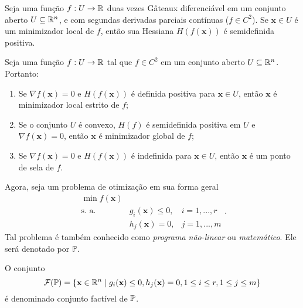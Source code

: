 \begin{theorem}
Seja uma fun\c{c}\~{a}o $f: U \to \mathbb{R}$ duas vezes G\^{a}teaux diferenci\'{a}vel em um conjunto aberto $U \subseteq \mathbb{R}^{n}$, e com segundas derivadas parciais cont\'{i}nuas ($f \in C^2$). Se $\mathbf{x} \in U$ \'{e} um minimizador local de $f$, ent\~{a}o sua Hessiana $H(f(\mathbf{x}))$ \'{e} semidefinida positiva.
\end{theorem}

\begin{theorem}
Seja uma fun\c{c}\~{a}o $f: U \to \mathbb{R}$ tal que $f \in C^2$ em um conjunto aberto $U \subseteq \mathbb{R}^{n}$. Portanto:
\begin{enumerate}[label=(\alph*)]
\item Se $\nabla f(\mathbf{x}) = 0$ e $H(f(\mathbf{x}))$ \'{e} definida positiva para $\mathbf{x} \in U$, ent\~{a}o $\mathbf{x}$ \'{e} minimizador local estrito de $f$;
\item Se o conjunto $U$ \'{e} convexo, $H(f)$ \'{e} semidefinida positiva em $U$ e $\nabla f(\mathbf{x}) = 0$, ent\~{a}o $\mathbf{x}$ \'{e} minimizador global de $f$;
\item Se $\nabla f(\mathbf{x}) = 0$ e $H(f(\mathbf{x}))$ \'{e} indefinida para $\mathbf{x} \in U$, ent\~{a}o $\mathbf{x}$ \'{e} um ponto de sela de $f$.
\end{enumerate}
\end{theorem}

Agora, seja um problema de otimiza\c{c}\~{a}o em sua forma geral
\begin{equation}
\label{compProb}
\begin{array}{ccc}
\min f(\mathbf{x}) & &\\
\text{s. a.} & g_i (\mathbf{x}) \le 0, & i = 1,...,r\\ 
 & h_j (\mathbf{x}) = 0, & j = 1,...,m
\end{array}.
\end{equation} Tal problema \'{e} tamb\'{e}m conhecido como \textit{programa n\~{a}o-linear} ou \textit{matem\'{a}tico}. Ele ser\'{a} denotado por $\mathbb{P}$.

\begin{definition}
O conjunto
\begin{equation*}
\mathcal{F}(\mathbb{P}) = \left\lbrace \mathbf{x} \in \mathbb{R}^{n} \mid g_i (\mathbf{x}) \le 0,h_j (\mathbf{x}) = 0, 1 \le i \le r, 1 \le j \le m \right\rbrace 
\end{equation*}
\'{e} denominado conjunto fact\'{i}vel de $\mathbb{P}$.
\end{definition} 

